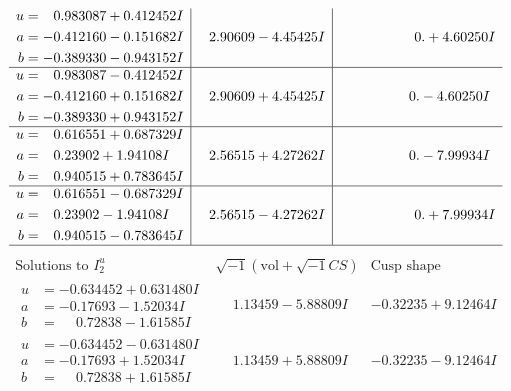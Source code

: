 \documentclass[1p]{elsarticle_modified}
\theoremstyle{definition}
\newcommand{\I}{\sqrt{-1}}
\begin{document}
$$\begin{array}{c|c|c}
\begin{aligned}
u &= \phantom{-}0.983087 + 0.412452 I \\
a &= -0.412160 - 0.151682 I \\
b &= -0.389330 - 0.943152 I\end{aligned}
 & \phantom{-}2.90609 - 4.45425 I & \phantom{-0.000000 -}0. + 4.60250 I \\ \hline\begin{aligned}
u &= \phantom{-}0.983087 - 0.412452 I \\
a &= -0.412160 + 0.151682 I \\
b &= -0.389330 + 0.943152 I\end{aligned}
 & \phantom{-}2.90609 + 4.45425 I & \phantom{-0.000000 } 0. - 4.60250 I \\ \hline\begin{aligned}
u &= \phantom{-}0.616551 + 0.687329 I \\
a &= \phantom{-}0.23902 + 1.94108 I \\
b &= \phantom{-}0.940515 + 0.783645 I\end{aligned}
 & \phantom{-}2.56515 + 4.27262 I & \phantom{-0.000000 } 0. - 7.99934 I \\ \hline\begin{aligned}
u &= \phantom{-}0.616551 - 0.687329 I \\
a &= \phantom{-}0.23902 - 1.94108 I \\
b &= \phantom{-}0.940515 - 0.783645 I\end{aligned}
 & \phantom{-}2.56515 - 4.27262 I & \phantom{-0.000000 -}0. + 7.99934 I\\
 \hline 
 \end{array}$$\newpage$$\begin{array}{c|c|c}  
\text{Solutions to }I^u_{2}& \I (\text{vol} + \sqrt{-1}CS) & \text{Cusp shape}\\
 \hline 
\begin{aligned}
u &= -0.634452 + 0.631480 I \\
a &= -0.17693 - 1.52034 I \\
b &= \phantom{-}0.72838 - 1.61585 I\end{aligned}
 & \phantom{-}1.13459 - 5.88809 I & -0.32235 + 9.12464 I \\ \hline\begin{aligned}
u &= -0.634452 - 0.631480 I \\
a &= -0.17693 + 1.52034 I \\
b &= \phantom{-}0.72838 + 1.61585 I\end{aligned}
 & \phantom{-}1.13459 + 5.88809 I & -0.32235 - 9.12464 I \\ \hline\begin{aligned}

\end{aligned}
\end{array}$$
\end{document}
